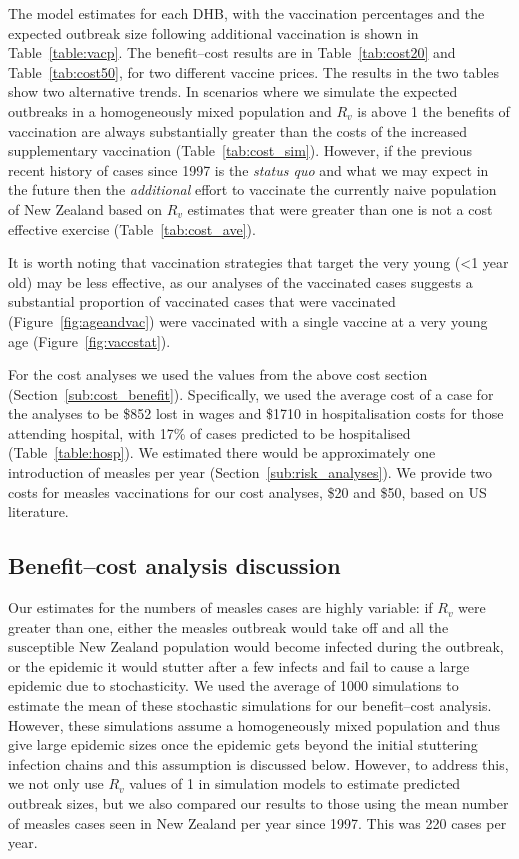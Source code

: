\documentclass{article}
\begin{document}
The model estimates for each DHB, with the vaccination percentages and the expected outbreak size following additional vaccination is shown in Table~\ref{table:vacp}. The benefit--cost results are in Table~\ref{tab:cost20} and Table~\ref{tab:cost50}, for two different vaccine prices. The results in the two tables show two alternative trends. In scenarios where we simulate the expected outbreaks in a homogeneously mixed population and $R_v$ is above 1 the benefits of vaccination are always substantially greater than the costs of the increased supplementary vaccination (Table~\ref{tab:cost_sim}). However, if the previous recent history of cases since 1997 is the \emph{status quo} and what we may expect in the future then the \emph{additional} effort to vaccinate the currently naive population of New Zealand based on $R_v$ estimates that were greater than one is not a cost effective exercise (Table~\ref{tab:cost_ave}).

It is worth noting that vaccination strategies that target the very young (<1 year old) may be less effective, as our analyses of the vaccinated cases suggests a substantial proportion of vaccinated cases that were vaccinated (Figure~\ref{fig:ageandvac}) were vaccinated with a single vaccine at a very young age (Figure~\ref{fig:vaccstat}).

For the cost analyses we used the values from the above cost section (Section~\ref{sub:cost_benefit}). Specifically, we used the average cost of a case for the analyses to be \$852 lost in wages and \$1710 in hospitalisation costs for those attending hospital, with 17\% of cases predicted to be hospitalised (Table~\ref{table:hosp}). We estimated there would be approximately one introduction of measles per year (Section~\ref{sub:risk_analyses}). We provide two costs for measles vaccinations for our cost analyses, \$20 and \$50, based on US literature.

\subsection{Benefit--cost analysis discussion}

Our estimates for the numbers of measles cases are highly variable: if $R_v$ were greater than one, either the measles outbreak would take off and all the susceptible New Zealand population would become infected during the outbreak, or the epidemic it would stutter after a few infects and fail to cause a large epidemic due to stochasticity. We used the average of 1000 simulations to estimate the mean of these stochastic simulations for our benefit--cost analysis. However, these simulations assume a homogeneously mixed population and thus give large epidemic sizes once the epidemic gets beyond the initial stuttering infection chains and this assumption is discussed below. However, to address this, we not only use $R_v$ values of 1 in simulation models to estimate predicted outbreak sizes, but we also compared our results to those using the mean number of measles cases seen in New Zealand per year since 1997. This was 220 cases per year.
\end{document}
